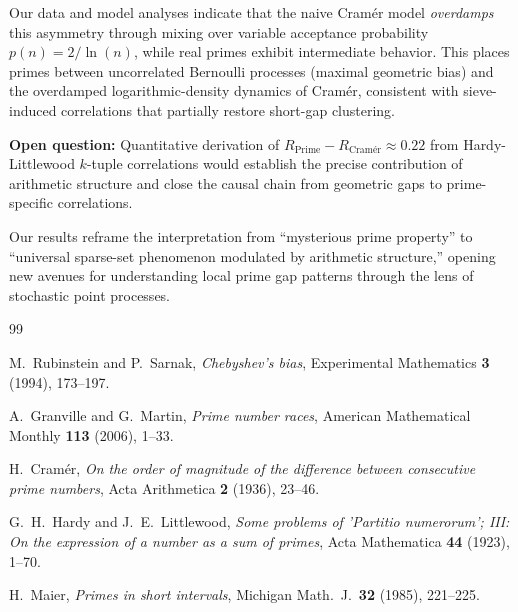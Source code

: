 \documentclass[11pt,a4paper]{article}
\theoremstyle{definition}
\theoremstyle{remark}
\begin{document}
Our data and model analyses indicate that the naive Cramér model \emph{overdamps} this asymmetry through mixing over variable acceptance probability $p(n) = 2/\ln(n)$, while real primes exhibit intermediate behavior. This places primes between uncorrelated Bernoulli processes (maximal geometric bias) and the overdamped logarithmic-density dynamics of Cramér, consistent with sieve-induced correlations that partially restore short-gap clustering.

\textbf{Open question:} Quantitative derivation of $R_{\text{Prime}} - R_{\text{Cramér}} \approx 0.22$ from Hardy-Littlewood $k$-tuple correlations would establish the precise contribution of arithmetic structure and close the causal chain from geometric gaps to prime-specific correlations.

Our results reframe the interpretation from ``mysterious prime property'' to ``universal sparse-set phenomenon modulated by arithmetic structure,'' opening new avenues for understanding local prime gap patterns through the lens of stochastic point processes.

\begin{thebibliography}{99}

M.~Rubinstein and P.~Sarnak, \emph{Chebyshev's bias}, Experimental Mathematics \textbf{3} (1994), 173--197.

A.~Granville and G.~Martin, \emph{Prime number races}, American Mathematical Monthly \textbf{113} (2006), 1--33.

H.~Cramér, \emph{On the order of magnitude of the difference between consecutive prime numbers}, Acta Arithmetica \textbf{2} (1936), 23--46.

G.~H.~Hardy and J.~E.~Littlewood, \emph{Some problems of 'Partitio numerorum'; III: On the expression of a number as a sum of primes}, Acta Mathematica \textbf{44} (1923), 1--70.

H.~Maier, \emph{Primes in short intervals}, Michigan Math.~J.~\textbf{32} (1985), 221--225.

\end{thebibliography}
\end{document}
